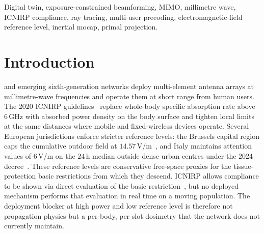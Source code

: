 \documentclass[journal,twocolumn,10pt]{IEEEtran}
\theoremstyle{plain}
\theoremstyle{remark}
\newcommand{\xx}{\mathbf{x}}
\newcommand{\Qmat}{\mathbf{Q}}
\begin{document}
\begin{abstract}
same $0\,\%$ violation rate on detected bodies on the same
instance. Aggregate violations against the full ground-truth
population sit at $\sim 0.6$-to-$2.4\,\%$ for both algorithms
across two seeds at $K = 25$, with statistical-tie-on-mean and
larger seed-to-seed variance for the dual ascent; both residuals
are concentrated entirely on undetected tier-C bystanders that
absent themselves from the QCQP, a sensing-pipeline floor rather
than a precoder-side property. Projected ZF is the preferred
deployable consumer of the body twin: it is a single scalar
scaling at $\sim 0.5\,$ms per slot vs $\sim 350\,$ms for the dual
ascent, and its feasibility on the detected set is by construction
at every slot rather than only at solver convergence. The dual-ascent solver
is the right tool for the academic uncapped-Shannon objective and
the min-TX-power formulation; we provide it in
\cref{app:dualascent}. The naive projected-area Cauchy bound
on $\xx^H \Qmat^{(u)} \xx$ is loose by 21 to $27\,$dB on the LOS
steering precoder and breached by 49 to $70\,\%$ of random and
shaped precoders; the conditional bound under a direction-set
restriction holds and is the safety envelope for the no-twin tier.
\end{abstract}

\begin{IEEEkeywords}
Digital twin, exposure-constrained beamforming, MIMO, millimetre wave,
ICNIRP compliance, ray tracing, multi-user precoding,
electromagnetic-field reference level, inertial mocap, primal
projection.
\end{IEEEkeywords}

\IEEEpeerreviewmaketitle


\section{Introduction}\label{sec:intro}
 and emerging sixth-generation
networks deploy multi-element antenna arrays at millimetre-wave
frequencies and operate them at short range from human users. The
2020 ICNIRP guidelines~\cite{ICNIRP2020} replace whole-body specific
absorption rate above $6\,$GHz with absorbed power density on the
body surface and tighten local limits at the same distances where
mobile and fixed-wireless devices operate. Several European
jurisdictions enforce stricter reference levels: the Brussels capital
region caps the cumulative outdoor field at
$14.57\,$V/m~\cite{BrusselsArrete2007,BrusselsArrete2024}, and Italy
maintains attention values of $6\,$V/m on the $24\,$h median outside
dense urban centres under the 2024 decree~\cite{ItalyDL}. These
reference levels are conservative free-space proxies for the
tissue-protection basic restrictions from which they descend.
ICNIRP allows compliance to be shown via direct evaluation of the
basic restriction~\cite{IEC62232}, but no deployed mechanism
performs that evaluation in real time on a moving population. The
deployment blocker at high power and low reference level is therefore
not propagation physics but a per-body, per-slot dosimetry that the
network does not currently maintain.
\end{document}
